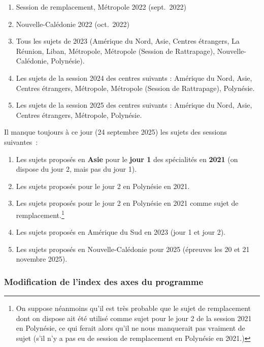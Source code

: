 \begin{enumerate}
\item Session de remplacement, Métropole 2022 (sept.~2022)
\item Nouvelle-Calédonie 2022 (oct.~2022)
\item Tous les sujets de 2023 (Amérique du Nord, Asie, Centres étrangers, La Réunion, Liban, Métropole, Métropole (Session de Rattrapage), Nouvelle-Calédonie, Polynésie).
\item Les sujets de la session 2024 des centres suivants : Amérique du Nord, Asie, Centres étrangers, Métropole, Métropole (Session de Rattrapage), Polynésie.
\item Les sujets de la session 2025 des centres suivants : Amérique du Nord, Asie, Centres étrangers, Métropole, Polynésie.
\end{enumerate}

Il manque toujours à ce jour (24 septembre 2025) les sujets des sessions suivantes~:

\begin{enumerate}
\item Les sujets proposés en \textbf{Asie} pour le \textbf{jour 1} des spécialités en \textbf{2021} (on dispose du jour 2, mais pas du jour 1).
\item Les sujets proposés pour le jour 2 en Polynésie en 2021.
\item Les sujets proposés pour le jour 2 en Polynésie en 2021 comme sujet de remplacement.\footnote{On suppose néanmoins qu'il est très probable que le sujet de remplacement dont on dispose ait été utilisé comme sujet pour le jour 2 de la session 2021 en Polynésie, ce qui ferait alors qu'il ne nous manquerait pas vraiment de sujet (s'il n'y a pas eu de session de remplacement en Polynésie en 2021.)}
\item Les sujets proposés en Amérique du Sud en 2023 (jour 1 et jour 2).
\item Les sujets proposés en Nouvelle-Calédonie pour 2025 (épreuves les 20 et 21 novembre 2025).
\end{enumerate}

\subsubsection{Modification de l'index des axes du programme}

